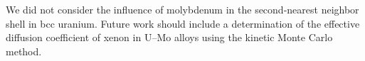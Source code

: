 We did not consider the influence of molybdenum in the second-nearest neighbor
shell in bcc uranium. Future work should include a determination of the
effective diffusion coefficient of xenon in U--Mo alloys using the
kinetic Monte Carlo method.








